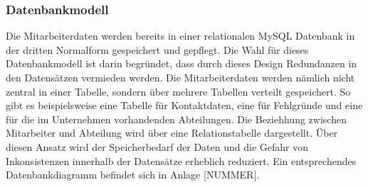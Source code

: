     \subsubsection{Datenbankmodell}
        Die Mitarbeiterdaten werden bereits in einer relationalen MySQL Datenbank in der dritten Normalform gespeichert und gepflegt. Die Wahl für dieses Datenbankmodell ist darin begründet, dass durch dieses Design Redundanzen in den Datensätzen vermieden werden. Die Mitarbeiterdaten werden nämlich nicht zentral in einer Tabelle, sondern über mehrere Tabellen verteilt gespeichert. So gibt es beispielsweise eine Tabelle für Kontaktdaten, eine für Fehlgründe und eine für die im Unternehmen vorhandenden Abteilungen. Die Beziehhung zwischen Mitarbeiter und Abteilung wird über eine Relationstabelle dargestellt. Über diesen Ansatz wird der Speicherbedarf der Daten und die Gefahr von Inkonsistenzen innerhalb der Datensätze erheblich reduziert. Ein entsprechendes Datenbankdiagramm befindet sich in Anlage [NUMMER].

